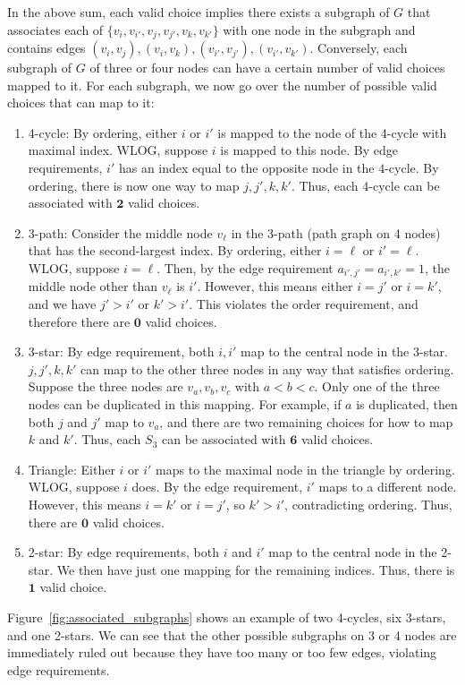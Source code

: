 {In the above sum, each valid choice implies there exists
a subgraph of $G$ that associates
each of $\{v_i, v_{i'}, v_j, v_{j'}, v_k, v_{k'}\}$ with one node in the subgraph and contains edges $(v_i, v_j), (v_i, v_k), (v_{i'}, v_{j'}), (v_{i'}, v_{k'})$.
Conversely,
each
subgraph of $G$ of three or four nodes can have a certain
number of valid choices mapped to it. For each
subgraph, we now go over the number of possible valid choices that can map to it:

\begin{enumerate}
    \item 4-cycle: By ordering, either $i$ or $i'$ is mapped to the node of the 4-cycle
    with maximal
    index. WLOG, suppose $i$ is mapped to this node. By edge requirements, $i'$ has an index equal
    to the opposite node in the $4$-cycle. By ordering, there is now one
    way to map $j,j',k,k'$. Thus, each 4-cycle can be associated with
    $\mathbf{2}$ valid choices.
    \item 3-path: Consider the middle node $v_\ell$ in the 3-path (path graph on 4 nodes) that has
    the second-largest index.
    By ordering, either $i=\ell$ or $i' = \ell$.
    WLOG, suppose $i = \ell$. Then, by the edge requirement $a_{i',j'} = a_{i', k'} = 1$, the middle node other than $v_\ell$ is
    $i'$. However, this means either $i = j'$ or $i = k'$, and we have $j' > i'$ or $k' > i'$.
    This violates the order requirement, and therefore there are $\textbf{0}$ valid choices.
    \item 3-star: By edge requirement, both $i,i'$ map to the central node in the 3-star.
    $j,j',k,k'$ can map to the other three nodes in any way that satisfies ordering.
    Suppose the three nodes are $v_{a}, v_{b}, v_c$ with $a < b < c$.
    Only one of
    the three nodes can be duplicated in this mapping.
    For example, if
    $a$ is duplicated, then both
    $j$ and $j'$
    map to $v_a$, and there are two remaining choices
    for how to map
    $k$ and $k'$.
    Thus,
    each $S_3$ can
    be associated with
    $\mathbf{6}$ valid choices.
    \item Triangle: Either $i$ or $i'$ maps to the maximal node in the triangle
    by ordering. WLOG, suppose $i$ does. By the edge requirement, $i'$ maps
    to a different node. However, this means $i = k'$ or $i=j'$, so $k' > i'$,
    contradicting ordering. Thus, there are $\textbf{0}$ valid choices.
    \item 2-star: By edge requirements, both $i$ and $i'$ map to the central node in the
    2-star. We then have just one mapping for the remaining indices. Thus, there
    is $\textbf{1}$ valid choice.
\end{enumerate}
Figure~\ref{fig:associated_subgraphs} shows an example of two 4-cycles, six 3-stars, and one 2-stars.
We can see that the other possible subgraphs on 3 or 4 nodes are immediately
ruled out because they have too many or too few edges, violating edge requirements.

}
